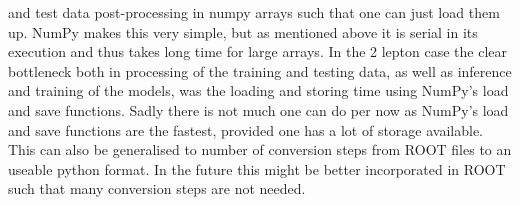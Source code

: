and test data post-processing in numpy arrays such that one can just load them up. NumPy makes this very simple, 
but as mentioned above it is serial in its execution and thus takes long time for large arrays. In the 2 lepton 
case the clear bottleneck both in processing of the training and testing data, as well as inference and training 
of the models, was the loading and storing time using NumPy's load and save functions. Sadly there is not much 
one can do per now as NumPy's load and save functions are the fastest, provided one has a lot of storage available. 
This can also be generalised to number of conversion steps from ROOT files to an useable python format. In the future
this might be better incorporated in ROOT such that many conversion steps are not needed.


